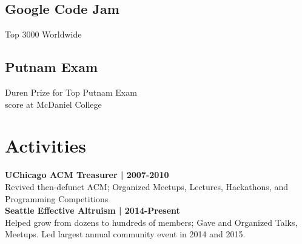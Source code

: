 \documentclass[]{resume}
\begin{document}
\begin{minipage}[t]{0.33\textwidth}
\subsection{Google Code Jam}
Top 3000 Worldwide \\
\sectionsep
\subsection{Putnam Exam}
Duren Prize for Top Putnam Exam \\
score at McDaniel College

\sectionsep

\section{Activities} 
\textbf{UChicago ACM Treasurer | 2007-2010} \\
Revived then-defunct ACM; Organized Meetups, Lectures, 
Hackathons, and Programming Competitions \\
\sectionsep
\textbf{Seattle Effective Altruism | 2014-Present}\\
Helped grow  from dozens to hundreds of members; 
Gave and Organized Talks, Meetups. Led largest annual 
community event in 2014 and 2015. \\


%
%

\end{minipage} 
\hfill
\end{document}
